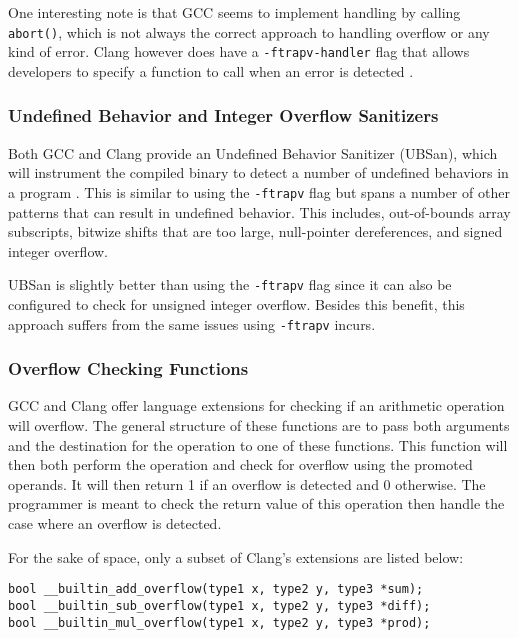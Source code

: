 One interesting note is that GCC seems to implement handling by calling \texttt{abort()}, which is not always the correct approach to handling overflow or any kind of error. Clang however does have a \texttt{-ftrapv-handler} flag that allows developers to specify a function to call when an error is detected \cite{clang-ftrapv}.

\subsubsection{Undefined Behavior and Integer Overflow Sanitizers}

Both GCC and Clang provide an Undefined Behavior Sanitizer (UBSan), which will instrument the compiled binary to detect a number of undefined behaviors in a program \cite{gcc-ubsan}\cite{clang-ubsan}. This is similar to using the \texttt{-ftrapv} flag but spans a number of other patterns that can result in undefined behavior. This includes, out-of-bounds array subscripts, bitwize shifts that are too large, null-pointer dereferences, and signed integer overflow.

UBSan is slightly better than using the \texttt{-ftrapv} flag since it can also be configured to check for unsigned integer overflow. Besides this benefit, this approach suffers from the same issues using \texttt{-ftrapv} incurs.

\subsubsection{Overflow Checking Functions}

GCC and Clang offer language extensions for checking if an arithmetic operation will overflow\cite{gcc-lang-ext}\cite{clang-lang-ext}. The general structure of these functions are to pass both arguments and the destination for the operation to one of these functions. This function will then both perform the operation and check for overflow using the promoted operands. It will then return 1 if an overflow is detected and 0 otherwise. The programmer is meant to check the return value of this operation then handle the case where an overflow is detected.

For the sake of space, only a subset of Clang's extensions are listed below:
\begin{tabbing}
\texttt{bool \_\_builtin\_add\_overflow(type1 x, type2 y, type3 *sum);}\\
\texttt{bool \_\_builtin\_sub\_overflow(type1 x, type2 y, type3 *diff);}\\
\texttt{bool \_\_builtin\_mul\_overflow(type1 x, type2 y, type3 *prod);}
\end{tabbing}

